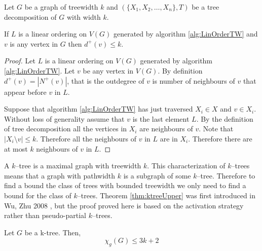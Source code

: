 \begin{lemma}[Askes] \label{Lemma_TWLinOrdBound}
    Let $G$ be a graph of treewidth $k$ and $(\{X_1,X_2,\dots,X_n\},T)$ be a tree decomposition of $G$ with width $k$.
    
    If $L$ is a linear ordering on $V(G)$ generated by algorithm \ref{alg:LinOrderTW} and $v$ is any vertex in $G$ then $d^+(v) \leq k$. 
\end{lemma}

\begin{proof}    
    Let $L$ is a linear ordering on $V(G)$ generated by algorithm \ref{alg:LinOrderTW}. Let $v$ be any vertex in $V(G)$. By definition $d^+(v) = |N^+(v)|$, that is the outdegree of $v$ is number of neighbours of $v$ that appear before $v$ in $L$. 
    
    Suppose that algorithm \ref{alg:LinOrderTW} has just traversed $X_i\in X$ and $v\in X_i$. Without loss of generality assume that $v$ is the last element $L$. By the definition of tree decomposition all the vertices in $X_i$ are neighbours of $v$. Note that $|X_i\setminus v|\leq k$. Therefore all the neighbours of $v$ in $L$ are in $X_i$. Therefore there are at most $k$ neighbours of $v$ in $L$.   
\end{proof}


A $k$--tree is a maximal graph with treewidth $k$. This characterization of $k$--trees means that a graph with pathwidth $k$ is a subgraph of some $k$--tree. Therefore to find a bound the class of trees with bounded treewidth we only need to find a bound for the class of $k$--trees. Theorem \ref{thm:ktreeUpper} was first introduced in Wu, Zhu 2008 \cite{WuZhu2008}, but the proof proved here is based on the activation strategy rather than pseudo-partial $k$--trees.
\begin{theorem} \label{thm:ktreeUpper}
        Let $G$ be a k-tree. Then, 
        \[\chi_g(G) \leq 3k + 2\]
\end{theorem}

